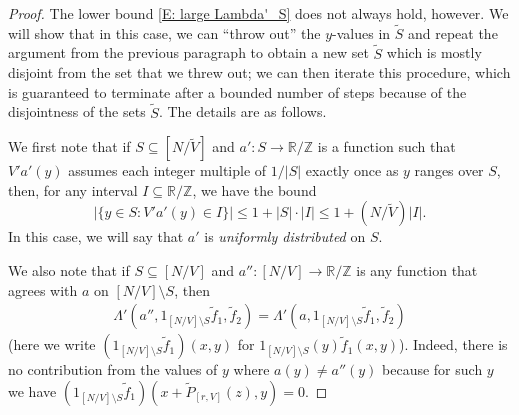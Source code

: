\documentclass[11pt]{amsart}
\theoremstyle{definition}
\begin{document}
\begin{proof}
The lower bound \eqref{E: large Lambda'_S} does not always hold, however.  We will show that in this case, we can ``throw out'' the $y$-values in $\widetilde S$ and repeat the argument from the previous paragraph to obtain a new set $\widetilde S$ which is mostly disjoint from the set that we threw out; we can then iterate this procedure, which is guaranteed to terminate after a bounded number of steps because of the disjointness of the sets $\widetilde S$.  The details are as follows.

We first note that if $S \subseteq [N/\widetilde V]$ and $a':S \to \mathbb{R}/\mathbb{Z}$ is a function such that $V'a'(y)$ assumes each integer multiple of $1/|S|$ exactly once as $y$ ranges over $S$, then, for any interval $I \subseteq \mathbb{R}/\mathbb{Z}$, we have the bound
\begin{equation}\label{eq:pseudorandom}
|\{y \in S: V'a'(y) \in I\}| \leq 1+|S| \cdot |I| \leq 1+(N/\widetilde V)|I|.
\end{equation}
In this case, we will say that $a'$ is \emph{uniformly distributed} on  $S$.

We also note that if $S \subseteq [N/V]$ and $a'':[N/V] \to \mathbb{R}/\mathbb{Z}$ is any function that agrees with $a$ on $[N/V] \setminus S$, then
\begin{align}\label{E: equivalence of lambdas'}
    \Lambda'(a'', 1_{[N/V]\setminus S} \widetilde f_1, \widetilde f_2)=\Lambda'(a, 1_{[N/V]\setminus S} \widetilde f_1, \widetilde f_2)
\end{align}
(here we write $(1_{[N/V]\setminus S} \widetilde f_1)(x,y)$ for $1_{[N/V]\setminus S}(y) \widetilde f_1(x,y)$).  Indeed, there is no contribution from the values of $y$ where $a(y) \neq a''(y)$ because for such $y$ we have $(1_{[N/V]\setminus S} \widetilde f_1)(x+\widetilde P_{[r,V]}(z),y)=0$.



\end{proof}
\end{document}
